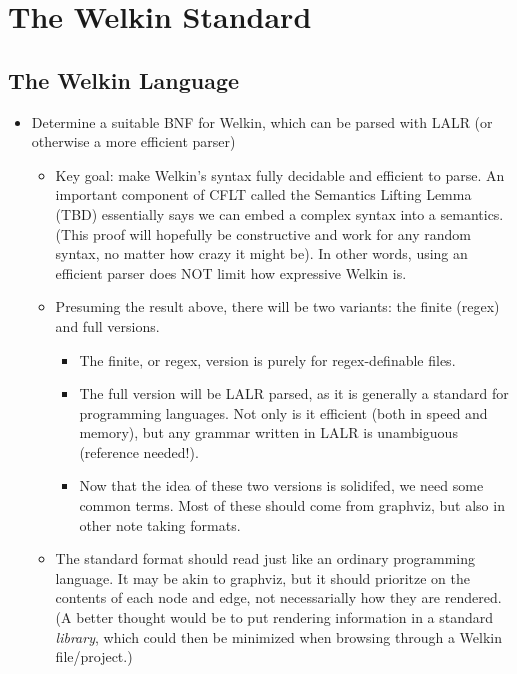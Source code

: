 \chapter{The Welkin Standard}

\section{The Welkin Language}

\begin{itemize}
  \item Determine a suitable BNF for Welkin, which can be parsed with LALR (or otherwise a more efficient parser)
  \begin{itemize}
    \item Key goal: make Welkin's syntax fully decidable and efficient to parse. An important component of CFLT called the Semantics Lifting Lemma (TBD) essentially says we can embed a complex syntax into a semantics. (This proof will hopefully be constructive and work for any random syntax, no matter how crazy it might be). In other words, using an efficient parser does NOT limit how expressive Welkin is.
    \item Presuming the result above, there will be two variants: the finite (regex) and full versions.
          \begin{itemize}
            \item The finite, or regex, version is purely for regex-definable files.
            \item The full version will be LALR parsed, as it is generally a standard for programming languages. Not only is it efficient (both in speed and memory), but any grammar written in LALR is unambiguous (reference needed!).
\item Now that the idea of these two versions is solidifed, we need some common terms. Most of these should come from graphviz, but also in other note taking formats.
          \end{itemize}
    \item The standard format should read just like an ordinary programming language. It may be akin to graphviz, but it should prioritze on the contents of each node and edge, not necessarially how they are rendered. (A better thought would be to put rendering information in a standard \textit{library}, which could then be minimized when browsing through a Welkin file/project.)

\end{itemize}
\end{itemize}
